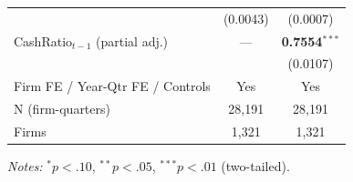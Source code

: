 \begin{table}[htbp]
\begin{tabular}{lcc}
 & (0.0043) & (0.0007) \\
CashRatio$_{t-1}$ (partial adj.) & --- & \textbf{0.7554}$^{***}$ \\
 &  & (0.0107) \\
\midrule
Firm FE / Year-Qtr FE / Controls & Yes & Yes \\
N (firm-quarters) & 28,191 & 28,191 \\
Firms & 1,321 & 1,321 \\
\bottomrule
\end{tabular}
\begin{minipage}{\linewidth}\vspace{2pt}\scriptsize
\textit{Notes:} $^{*}p<.10$, $^{**}p<.05$, $^{***}p<.01$ (two-tailed).
\end{minipage}
\end{table}